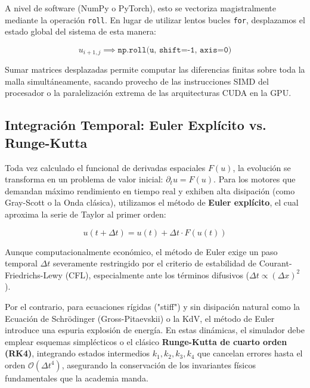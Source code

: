 \documentclass[12pt]{article}
\begin{document}
A nivel de software (NumPy o PyTorch), esto se vectoriza magistralmente mediante la operación \texttt{roll}. En lugar de utilizar lentos bucles \texttt{for}, desplazamos el estado global del sistema de esta manera:

\begin{equation}
u_{i+1,j} \implies \texttt{np.roll(u, shift=-1, axis=0)}
\end{equation}

Sumar matrices desplazadas permite computar las diferencias finitas sobre toda la malla simultáneamente, sacando provecho de las instrucciones SIMD del procesador o la paralelización extrema de las arquitecturas CUDA en la GPU.

\subsection{Integración Temporal: Euler Explícito vs. Runge-Kutta}
Toda vez calculado el funcional de derivadas espaciales $F(u)$, la evolución se transforma en un problema de valor inicial: $\partial_t u = F(u)$. Para los motores que demandan máximo rendimiento en tiempo real y exhiben alta disipación (como Gray-Scott o la Onda clásica), utilizamos el método de \textbf{Euler explícito}, el cual aproxima la serie de Taylor al primer orden:

\begin{equation}
u(t + \Delta t) = u(t) + \Delta t \cdot F(u(t))
\end{equation}

Aunque computacionalmente económico, el método de Euler exige un paso temporal $\Delta t$ severamente restringido por el criterio de estabilidad de Courant-Friedrichs-Lewy (CFL), especialmente ante los términos difusivos ($\Delta t \propto (\Delta x)^2$). 

Por el contrario, para ecuaciones rígidas ("stiff") y sin disipación natural como la Ecuación de Schrödinger (Gross-Pitaevskii) o la KdV, el método de Euler introduce una espuria explosión de energía. En estas dinámicas, el simulador debe emplear esquemas simplécticos o el clásico \textbf{Runge-Kutta de cuarto orden (RK4)}, integrando estados intermedios $k_1, k_2, k_3, k_4$ que cancelan errores hasta el orden $\mathcal{O}(\Delta t^4)$, asegurando la conservación de los invariantes físicos fundamentales que la academia manda.
\end{document}

